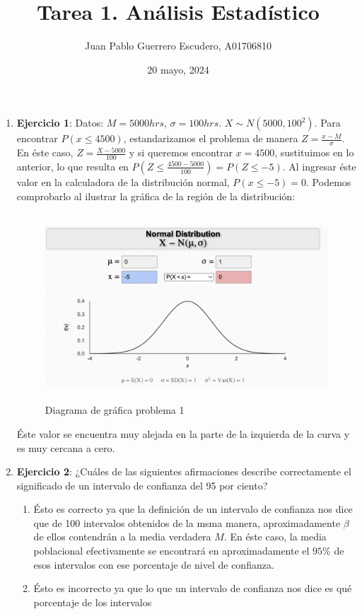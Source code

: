 \documentclass[12pt, letterpaper]{report}
\title{Tarea 1. Análisis Estadístico}
\author{Juan Pablo Guerrero Escudero, A01706810}
\date{20 mayo, 2024}
\begin{document}
\maketitle
\begin{enumerate}
\item \textbf{Ejercicio 1}: 
Datos: $M = 5000 hrs$, $\sigma = 100 hrs$. $X \sim N(5000, 100^2)$. Para encontrar $P(x \leq 4500)$, estandarizamos 
el problema de manera $Z = \frac{x - M}{\sigma}$. En éste caso, $Z = \frac{X - 5000}{100}$ y si queremos encontrar $x = 4500$, 
sustituimos en lo anterior, lo que resulta en $P(Z \leq \frac{4500 - 5000}{100}) = P(Z \leq -5)$. Al ingresar éste valor en 
la calculadora de la distribución normal, $P(x \leq -5) = 0$. Podemos comprobarlo al ilustrar la gráfica de la región de la 
distribución: 
\begin{figure}[H]
    \centering
    \includegraphics[height = 7cm]{Fig1_DistribucionNormal_P1T1_AnalisisEstadistico.png}
    \caption{Diagrama de gráfica problema 1}
\end{figure}
Éste valor se encuentra muy alejada en la parte de la izquierda de la curva y es muy cercana a cero. 
\item \textbf{Ejercicio 2}: ¿Cuáles de las siguientes afirmaciones describe correctamente el significado
de un intervalo de confianza del 95 por ciento?     
\begin{enumerate}
\item Ésto es correcto ya que la definición de un intervalo de confianza nos dice que de 100 intervalos obtenidos 
de la msma manera, aproximadamente $\beta $ de ellos contendrán a la media verdadera $M$. En éste caso, la media 
poblacional efectivamente se encontrará en aproximadamente el $95$\% de esos intervalos con ese porcentaje de 
nivel de confianza. 
\item Ésto es incorrecto ya que lo que un intervalo de confianza nos dice es qué porcentaje de los intervalos 

\end{enumerate}
\end{enumerate}
\end{document}
